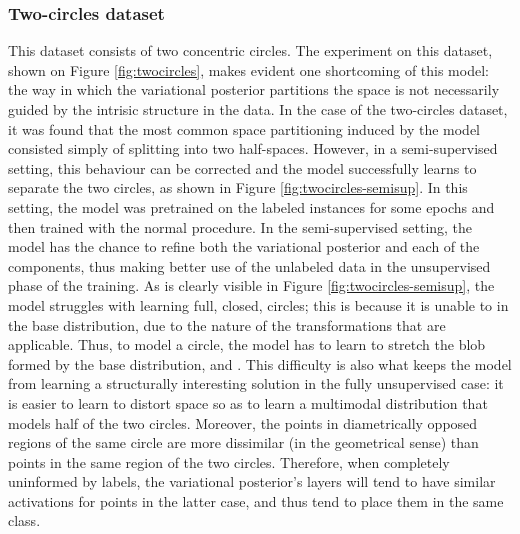 \subsubsection{Two-circles dataset}
This dataset consists of two concentric circles. The experiment on this dataset,
shown on Figure \ref{fig:twocircles}, makes evident one shortcoming of this
model: the way in which the variational posterior partitions the space is
not necessarily guided by the intrisic structure in the data. In the case of
the two-circles dataset, it was found that the most common space partitioning
induced by the model consisted simply of splitting into two half-spaces. However, in
a semi-supervised setting, this behaviour can be corrected and the model
successfully learns to separate the two circles, as shown in Figure
\ref{fig:twocircles-semisup}. In this setting, the model was pretrained on
the labeled instances for some epochs and then trained with the normal procedure.
In the semi-supervised setting, the model has the chance to refine both the
variational posterior and each of the components, thus making better use of
the unlabeled data in the unsupervised phase of the training. As is clearly
visible in Figure \ref{fig:twocircles-semisup}, the model struggles with
learning full, closed, circles; this is because it is unable to 
in the base distribution, due to the nature of the transformations that are
applicable. Thus, to model a circle, the model has to learn to stretch the blob
formed by the base distribution, and . This difficulty
is also what keeps the model from learning a structurally interesting solution
in the fully unsupervised case: it is easier to learn to distort space so as to
learn a multimodal distribution that models half of the two circles. Moreover,
the points in diametrically opposed regions of the same circle are more dissimilar
(in the geometrical sense) than points in the same region of the two circles.
Therefore, when completely uninformed by labels, the variational posterior's
layers will tend to have similar activations for points in the latter case, and
thus tend to place them in the same class.

